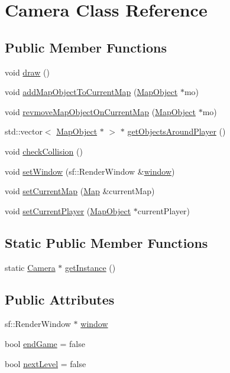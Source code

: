 \hypertarget{class_camera}{}\section{Camera Class Reference}
\label{class_camera}
\subsection*{Public Member Functions}
\begin{DoxyCompactItemize}
\item 
void \hyperlink{class_camera_aa4f4c0d553438e8d800ed0289e49e073}{draw} ()
\item 
void \hyperlink{class_camera_a6281b7d0cc9b0b7109b0339323b0a104}{add\+Map\+Object\+To\+Current\+Map} (\hyperlink{class_map_object}{Map\+Object} $\ast$mo)
\item 
void \hyperlink{class_camera_abfb871ec83f37834e1e6bcc721a1fc5d}{revmove\+Map\+Object\+On\+Current\+Map} (\hyperlink{class_map_object}{Map\+Object} $\ast$mo)
\item 
std\+::vector$<$ \hyperlink{class_map_object}{Map\+Object} $\ast$ $>$ $\ast$ \hyperlink{class_camera_a3f29ef2351bb7864cab6952003f8f7c7}{get\+Objects\+Around\+Player} ()
\item 
void \hyperlink{class_camera_a26e0f230b9e9152e52d5f15a0c43bfba}{check\+Collision} ()
\item 
void \hyperlink{class_camera_a6f05dbc0ce5855ba2428cc0b8f8779f9}{set\+Window} (sf\+::\+Render\+Window \&\hyperlink{class_camera_aaea4f29f0bd925f8d8288b7b7dfb0d8d}{window})
\item 
void \hyperlink{class_camera_a107ef96b885884869016e0543c5539b9}{set\+Current\+Map} (\hyperlink{class_map}{Map} \&current\+Map)
\item 
void \hyperlink{class_camera_a216bafd8dd8327ce3e92f86a8ffeb2b8}{set\+Current\+Player} (\hyperlink{class_map_object}{Map\+Object} $\ast$current\+Player)
\end{DoxyCompactItemize}
\subsection*{Static Public Member Functions}
\begin{DoxyCompactItemize}
\item 
static \hyperlink{class_camera}{Camera} $\ast$ \hyperlink{class_camera_a6eeeb651e0d1f5cb5e1266bd994baf82}{get\+Instance} ()
\end{DoxyCompactItemize}
\subsection*{Public Attributes}
\begin{DoxyCompactItemize}
\item 
sf\+::\+Render\+Window $\ast$ \hyperlink{class_camera_aaea4f29f0bd925f8d8288b7b7dfb0d8d}{window}
\item 
bool \hyperlink{class_camera_a9a52cd3423a98df63e8bc98e88f441f5}{end\+Game} = false
\item 
bool \hyperlink{class_camera_a1f10d515adcdde3a5e8b075d86693aab}{next\+Level} = false
\end{DoxyCompactItemize}


